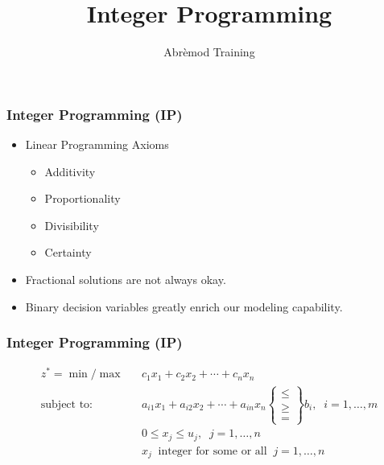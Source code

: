 \documentclass[12pt,handout]{beamer}
\title{Integer Programming}
\author{Abr\`emod Training}
\begin{document}

\begin{frame}
\titlepage
\end{frame}

\begin{frame}
\frametitle{Integer Programming (IP)}
\begin{itemize}
\item Linear Programming Axioms
\begin{itemize}
\item Additivity
\item Proportionality
\item {\color{red} Divisibility}
\item Certainty
\end{itemize}
\item Fractional solutions are not always okay.
\item Binary decision variables greatly enrich our modeling capability.
\end{itemize}
\end{frame}

\begin{frame}
\frametitle{Integer Programming (IP)}
\begin{eqnarray}
z^* = \min / \max && c_1 x_1 + c_2 x_2 + \cdots + c_n x_n \nonumber \\
\mbox{subject to:} &&a_{i1} x_1 + a_{i2} x_2 + \cdots + a_{in} x_n
\begin{Bmatrix}   \le \\
                   \ge \\
                    =
\end{Bmatrix}
b_i,\;\;i = 1,\ldots,m \nonumber \\
&&0 \le x_j \le u_j,\;\;j = 1,\ldots,n \nonumber \\
&&x_j \;\;\mbox{integer for some or all}\;\; j = 1,\ldots,n \nonumber
\end{eqnarray}
\end{frame}
\end{document}
